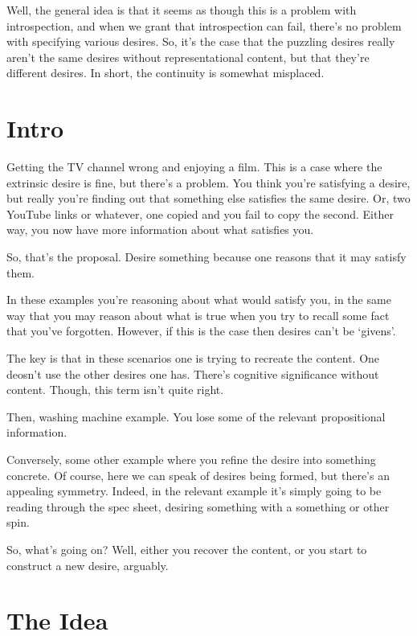 \documentclass[10pt]{article}
\begin{document}
{\color{blue} Well, the general idea is that it seems as though this is a problem with introspection, and when we grant that introspection can fail, there's no problem with specifying various desires.
  So, it's the case that the puzzling desires really aren't the same desires without representational content, but that they're different desires.
  In short, the continuity is somewhat misplaced.}



\section{Intro}
\label{sec:intro}

Getting the TV channel wrong and enjoying a film.
This is a case where the extrinsic desire is fine, but there's a problem.
You think you're satisfying a desire, but really you're finding out that something else satisfies the same desire.
Or, two YouTube links or whatever, one copied and you fail to copy the second.
Either way, you now have more information about what satisfies you.

So, that's the proposal.
Desire something because one reasons that it may satisfy them.

In these examples you're reasoning about what would satisfy you, in the same way that you may reason about what is true when you try to recall some fact that you've forgotten.
However, if this is the case then desires can't be `givens'.

The key is that in these scenarios one is trying to recreate the content.
One deosn't use the other desires one has.
There's cognitive significance without content.
Though, this term isn't quite right.


Then, washing machine example.
You lose some of the relevant propositional information.

Conversely, some other example where you refine the desire into something concrete.
Of course, here we can speak of desires being formed, but there's an appealing symmetry.
Indeed, in the relevant example it's simply going to be reading through the spec sheet, desiring something with a something or other spin.


So, what's going on?
Well, either you recover the content, or you start to construct a new desire, arguably.



\section{The Idea}
\label{sec:idea}
\end{document}
